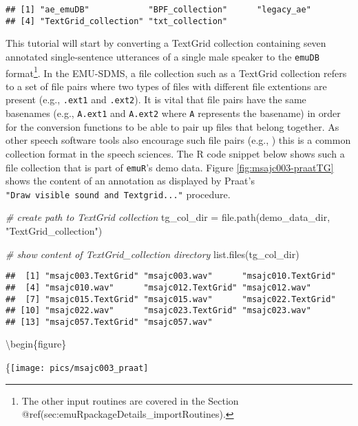 \documentclass[
]{book}
\newenvironment{Shaded}{\begin{snugshade}}{\end{snugshade}}
\newcommand{\CommentTok}[1]{\textcolor[rgb]{0.56,0.35,0.01}{\textit{#1}}}
\newcommand{\FunctionTok}[1]{\textcolor[rgb]{0.00,0.00,0.00}{#1}}
\newcommand{\NormalTok}[1]{#1}
\newcommand{\OtherTok}[1]{\textcolor[rgb]{0.56,0.35,0.01}{#1}}
\newcommand{\StringTok}[1]{\textcolor[rgb]{0.31,0.60,0.02}{#1}}
\begin{document}
\begin{verbatim}
## [1] "ae_emuDB"            "BPF_collection"      "legacy_ae"          
## [4] "TextGrid_collection" "txt_collection"
\end{verbatim}

This tutorial will start by converting a TextGrid collection containing seven annotated single-sentence utterances of a single male speaker to the \texttt{emuDB} format\footnote{The other input routines are covered in the Section @ref(sec:emuRpackageDetails\_importRoutines).}. In the EMU-SDMS, a file collection such as a TextGrid collection refers to a set of file pairs where two types of files with different file extentions are present (e.g., \texttt{.ext1} and \texttt{.ext2}). It is vital that file pairs have the same basenames (e.g., \texttt{A.ext1} and \texttt{A.ext2} where \texttt{A} represents the basename) in order for the conversion functions to be able to pair up files that belong together. As other speech software tools also encourage such file pairs (e.g., \citet{kisler:2015a}) this is a common collection format in the speech sciences. The R code snippet below shows such a file collection that is part of \texttt{emuR}'s demo data. Figure \ref{fig:msajc003-praatTG} shows the content of an annotation as displayed by Praat's \texttt{"Draw\ visible\ sound\ and\ Textgrid..."} procedure.

\begin{Shaded}
\begin{Highlighting}[]
\CommentTok{\# create path to TextGrid collection}
\NormalTok{tg\_col\_dir }\OtherTok{=} \FunctionTok{file.path}\NormalTok{(demo\_data\_dir, }\StringTok{"TextGrid\_collection"}\NormalTok{)}

\CommentTok{\# show content of TextGrid\_collection directory}
\FunctionTok{list.files}\NormalTok{(tg\_col\_dir)}
\end{Highlighting}
\end{Shaded}

\begin{verbatim}
##  [1] "msajc003.TextGrid" "msajc003.wav"      "msajc010.TextGrid"
##  [4] "msajc010.wav"      "msajc012.TextGrid" "msajc012.wav"     
##  [7] "msajc015.TextGrid" "msajc015.wav"      "msajc022.TextGrid"
## [10] "msajc022.wav"      "msajc023.TextGrid" "msajc023.wav"     
## [13] "msajc057.TextGrid" "msajc057.wav"
\end{verbatim}

\textbackslash begin\{figure\}

\{\centering \texttt{[image: pics/msajc003\_praat]}
\end{document}
